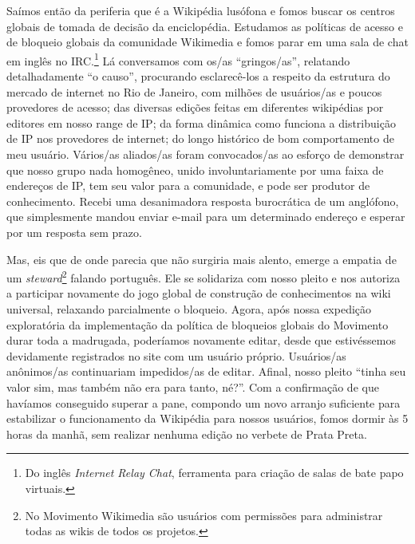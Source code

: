Saímos então da periferia que é a Wikipédia lusófona e fomos buscar os centros globais de tomada de decisão da enciclopédia. Estudamos as políticas de acesso e de bloqueio globais da comunidade Wikimedia e fomos parar em uma sala de chat em inglês no IRC.\footnote{Do inglês \textit{Internet Relay Chat}, ferramenta para criação de salas de bate papo virtuais.} Lá conversamos com os/as ``gringos/as'', relatando detalhadamente ``o causo'', procurando esclarecê-los a respeito da estrutura do mercado de internet no Rio de Janeiro, com milhões de usuários/as e poucos provedores de acesso; das diversas edições feitas em diferentes wikipédias por editores em nosso range de IP; da forma dinâmica como funciona a distribuição de IP nos provedores de internet; do longo histórico de bom comportamento de meu usuário. Vários/as aliados/as foram convocados/as ao esforço de demonstrar que nosso grupo nada homogêneo, unido involuntariamente por uma faixa de endereços de IP, tem seu valor para a comunidade, e pode ser produtor de conhecimento. Recebi uma desanimadora resposta burocrática de um anglófono, que simplesmente mandou enviar e-mail para um determinado endereço e esperar por um resposta sem prazo.

Mas, eis que de onde parecia que não surgiria mais alento, emerge a empatia de um \textit{steward}\footnote{No Movimento Wikimedia são usuários com permissões para administrar todas as wikis de todos os projetos.} falando português. Ele se solidariza com nosso pleito e nos autoriza a participar novamente do jogo global de construção de conhecimentos na wiki universal, relaxando parcialmente o bloqueio. Agora, após nossa expedição exploratória da implementação da política de bloqueios globais do Movimento durar toda a madrugada, poderíamos novamente editar, desde que estivéssemos devidamente registrados no site com um usuário próprio. Usuários/as anônimos/as continuariam impedidos/as de editar. Afinal, nosso pleito ``tinha seu valor sim, mas também não era para tanto, né?''. Com a confirmação de que havíamos conseguido superar a pane, compondo um novo arranjo suficiente para estabilizar o funcionamento da Wikipédia para nossos usuários, fomos dormir às 5 horas da manhã, sem realizar nenhuma edição no verbete de Prata Preta.